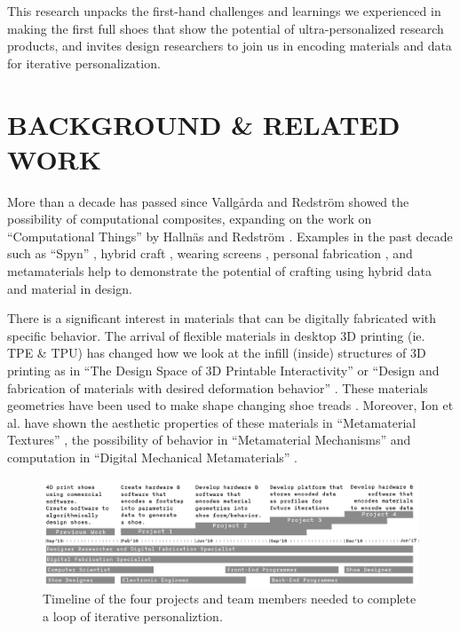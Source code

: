 This research unpacks the first-hand challenges and learnings we experienced in making the first full shoes that show the potential of ultra-personalized research products, and invites design researchers to join us in encoding materials and data for iterative personalization.

\section{BACKGROUND \& RELATED WORK }

More than a decade has passed since Vallg\aa rda and Redstr\"om \cite{Vallgarda2007} showed the possibility of computational composites, expanding on the work on ``Computational Things'' by Halln\"as and Redstr\"om \cite{Hallnas2002}. Examples in the past decade such as ``Spyn'' \cite{Rosner2010}, hybrid craft \cite{Zoran2015}, wearing screens \cite{Devendorf2016}, personal fabrication \cite{Baudisch2017}, and metamaterials \cite{Ion2016} help to demonstrate the potential of crafting using hybrid data and material in design. 

There is a significant interest in materials that can be digitally fabricated with specific behavior. The arrival of flexible materials in desktop 3D printing (ie. TPE \& TPU) has changed how we look at the infill (inside) structures of 3D printing as in ``The Design Space of 3D Printable Interactivity'' \cite{Ballagas2018} or ``Design and fabrication of materials with desired deformation behavior'' \cite{Bickel2010}. These materials geometries have been used to make shape changing shoe treads \cite{Ion2018}. Moreover, Ion et al. have shown the aesthetic properties of these materials in ``Metamaterial Textures'' \cite{Ion2018a}, the possibility of behavior in ``Metamaterial Mechanisms'' \cite{Ion2016} and computation in ``Digital Mechanical Metamaterials'' \cite{Ion2017}. 

\begin{figure}[htb]
\includegraphics[width=.9\textwidth]{Timeline}
\caption{Timeline of the four projects and team members needed to complete a loop of iterative personaliztion.  }
\label{fig:timeline}
\end{figure}

